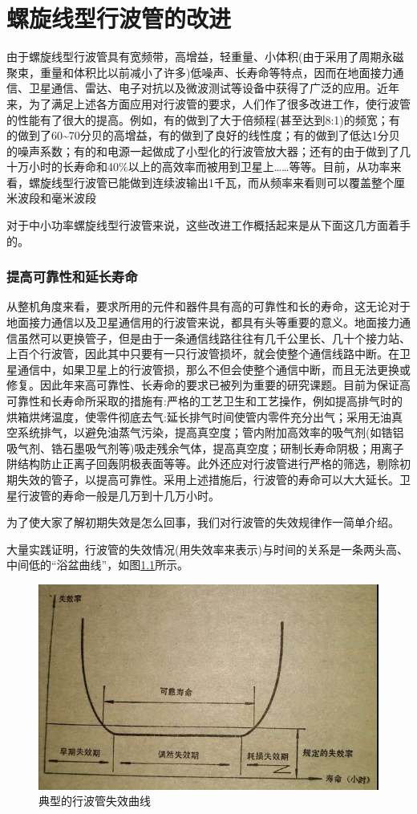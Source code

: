 \chapter{螺旋线型行波管的改进}
由于螺旋线型行波管具有宽频带，高增益，轻重量、小体积(由于采用了周期永磁聚束，重量和体积比以前减小了许多)低噪声、长寿命等特点，因而在地面接力通信、卫星通信、雷达、电子对抗以及微波测试等设备中获得了广泛的应用。近年来，为了满足上述各方面应用对行波管的要求，人们作了很多改进工作，使行波管的性能有了很大的提高。例如，有的做到了大于倍频程(甚至达到8:1)的频宽；有的做到了60\textasciitilde70分贝的高增益，有的做到了良好的线性度；有的做到了低达1分贝的噪声系数；有的和电源一起做成了小型化的行波管放大器；还有的由于做到了几十万小时的长寿命和40\%以上的高效率而被用到卫星上……等等。目前，从功率来看，螺旋线型行波管已能做到连续波输出1千瓦，而从频率来看则可以覆盖整个厘米波段和毫米波段

对于中小功率螺旋线型行波管来说，这些改进工作概括起来是从下面这几方面着手的。
\subsection{提高可靠性和延长寿命}
从整机角度来看，要求所用的元件和器件具有高的可靠性和长的寿命，这无论对于地面接力通信以及卫星通信用的行波管来说，都具有头等重要的意义。地面接力通信虽然可以更换管子，但是由于一条通信线路往往有几千公里长、几十个接力站、上百个行波管，因此其中只要有一只行波管损坏，就会使整个通信线路中断。在卫星通信中，如果卫星上的行波管损，那么不但会使整个通信中断，而且无法更换或修复。因此年来高可靠性、长寿命的要求已被列为重要的研究课题。目前为保证高可靠性和长寿命所采取的措施有:严格的工艺卫生和工艺操作，例如提高排气时的烘箱烘烤温度，使零件彻底去气:延长排气时间使管内零件充分出气；采用无油真空系统排气，以避免油蒸气污染，提高真空度；管内附加高效率的吸气剂(如锆铝吸气剂、锆石墨吸气剂等)吸走残余气体，提高真空度；研制长寿命阴极；用离子阱结构防止正离子回轰阴极表面等等。此外还应对行波管进行严格的筛选，剔除初期失效的管子，以提高可靠性。采用上述措施后，行波管的寿命可以大大延长。卫星行波管的寿命一般是几万到十几万小时。

为了使大家了解初期失效是怎么回事，我们对行波管的失效规律作一简单介绍。

大量实践证明，行波管的失效情况(用失效率来表示)与时间的关系是一条两头高、中间低的“浴盆曲线”，如图\ref{ch13-1}所示。
\begin{figure}[phtb]
	\centering
	\includegraphics[width=0.52\linewidth]{figure/ch13-1}
	\caption{典型的行波管失效曲线}
	\label{ch13-1}
\end{figure}


